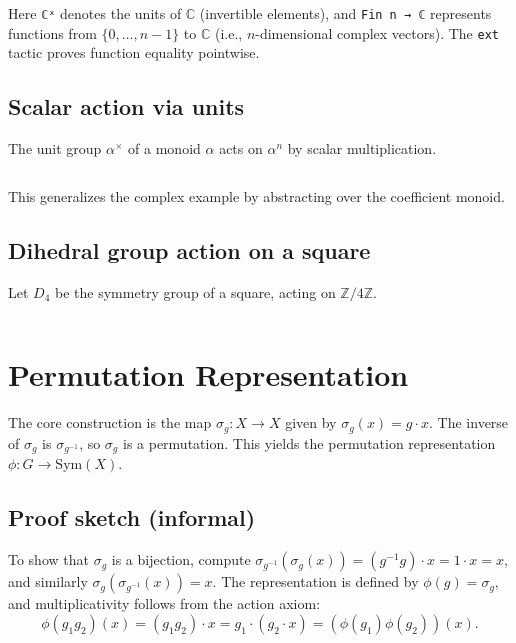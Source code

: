 \documentclass[
  12pt, %
]{assignment}
\newcommand{\leancodeurl}{}
\newcommand{\setleancodeurl}[1]{\renewcommand{\leancodeurl}{#1}}
\newcommand{\leancodefile}[3][]{%
  \setleancodeurl{#3}%
  \inputminted[fontsize=\footnotesize,breaklines,breakanywhere,tabsize=4,showspaces=false,linenos=true,#1]{lean4}{#2}%
}
\begin{document}
Here \texttt{ℂˣ} denotes the units of $\mathbb{C}$ (invertible elements), and
\texttt{Fin n → ℂ} represents functions from $\{0, \ldots, n-1\}$ to $\mathbb{C}$
(i.e., $n$-dimensional complex vectors). The \texttt{ext} tactic proves function equality
pointwise.

\subsection{Scalar action via units}
The unit group $\alpha^\times$ of a monoid $\alpha$ acts on $\alpha^n$ by scalar multiplication.

\leancodefile[firstline=103,lastline=115,firstnumber=103]{../lean/GroupAction/Examples.lean}{https://github.com/FrankieeW/GroupAction/blob/v1.0.0/lean/GroupAction/Examples.lean}

This generalizes the complex example by abstracting over the coefficient monoid.

\subsection{Dihedral group action on a square}
Let $D_4$ be the symmetry group of a square, acting on $\mathbb{Z}/4\mathbb{Z}$.

\leancodefile[firstline=134,lastline=155,firstnumber=134]{../lean/GroupAction/Examples.lean}{https://github.com/FrankieeW/GroupAction/blob/v1.0.0/lean/GroupAction/Examples.lean}

\section{Permutation Representation}
The core construction is the map $\sigma_g : X \to X$ given by $\sigma_g(x) = g \cdot x$.
The inverse of $\sigma_g$ is $\sigma_{g^{-1}}$, so $\sigma_g$ is a permutation.
This yields the permutation representation $\phi : G \to \mathrm{Sym}(X)$.

\subsection{Proof sketch (informal)}
To show that $\sigma_g$ is a bijection, compute
$\sigma_{g^{-1}}(\sigma_g(x)) = (g^{-1} g) \cdot x = 1 \cdot x = x$, and similarly
$\sigma_g(\sigma_{g^{-1}}(x)) = x$. The representation is defined by
$\phi(g) = \sigma_g$, and multiplicativity follows from the action axiom:
\[
	\phi(g_1 g_2)(x) = (g_1 g_2) \cdot x = g_1 \cdot (g_2 \cdot x) = (\phi(g_1)\phi(g_2))(x).
\]
\end{document}
